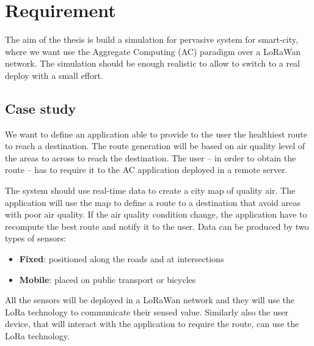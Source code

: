 \chapter{Requirement}
The aim of the thesis is build a simulation for pervasive system for smart-city, where we want use the Aggregate Computing (AC) paradigm over a LoRaWan network. The simulation should be enough realistic to allow to switch to a real deploy with a small effort.

\section{Case study}

We want to define an application able to provide to the user the healthiest route to reach a destination. The route generation will be based on air quality level of the areas to across to reach the destination. The user -- in order to obtain the route -- has to require it to the AC application deployed in a remote server.

The system should use real-time data to create a city map of quality air.
The application will use the map to define a route to a destination that avoid areas with poor air quality.
If the air quality condition change, the application have to recompute the best route and notify it to the user. 
Data can be produced by two types of sensors:
\begin{itemize}
    \item \textbf{Fixed}: positioned along the roads and at intersections
    \item \textbf{Mobile}: placed on public transport or bicycles
\end{itemize}

All the sensors will be deployed in a LoRaWan network and they will use the LoRa technology to communicate their sensed value. Similarly also the user device, that will interact with the application to require the route, can use the LoRa technology.